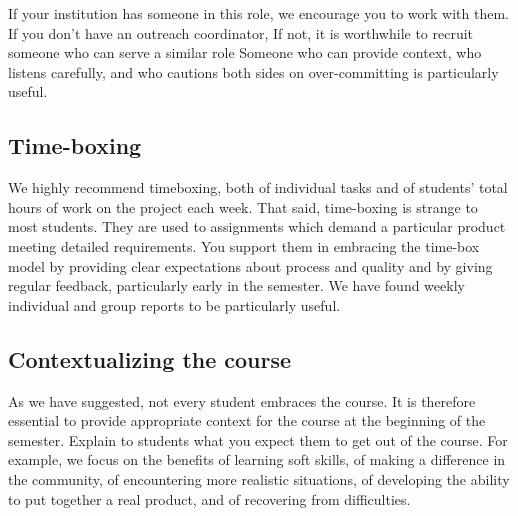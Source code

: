 If your institution has someone in this role, we encourage you to
work with them.  If you don't have an outreach coordinator, If not,
it is worthwhile to recruit someone who can serve a similar role
Someone who can provide context, who listens carefully, and who
cautions both sides on over-committing is particularly useful.

\subsection{Time-boxing}

We highly recommend timeboxing, both of individual tasks and of students' 
total hours of work on the project each week.
That said, 
time-boxing is strange to most students.  They are used to assignments 
which demand a particular
product meeting detailed requirements.  You support them in embracing the
time-box model by providing clear expectations about process and quality and
by giving regular feedback, particularly early in the semester.  We have
found weekly individual and group reports to be particularly useful.

\subsection{Contextualizing the course}

As we have suggested, not every student embraces the course.  It
is therefore essential to provide appropriate context for the course at
the beginning of the semester.  Explain to students what you expect them
to get out of the course.  For example, we focus on the benefits of learning
soft skills, of making a difference in the community, of encountering
more realistic situations, of developing the ability to put together a
real product, and of recovering from difficulties.
